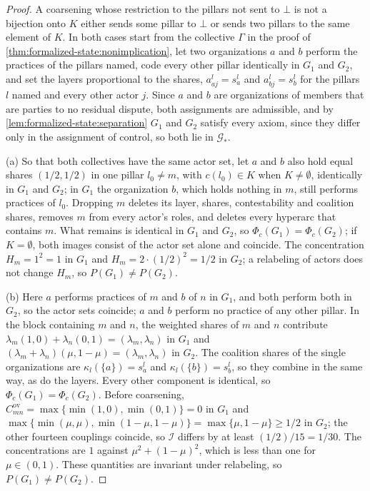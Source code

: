 \documentclass[11pt,letterpaper]{article}
\theoremstyle{definition}
\theoremstyle{remark}
\newcommand{\Integ}{\mathcal{I}}
\newcommand{\ov}{\mathrm{ov}}
\begin{document}
\begin{proof}
A coarsening whose restriction to the pillars not sent to $\bot$ is not a bijection onto $K$ either sends some pillar to $\bot$ or sends two pillars to the same element of $K$. In both cases start from the collective $\Gamma$ in the proof of \cref{thm:formalized-state:nonimplication}, let two organizations $a$ and $b$ perform the practices of the pillars named, code every other pillar identically in $G_1$ and $G_2$, and set the layers proportional to the shares, $a^{l}_{aj}=s^{l}_a$ and $a^{l}_{bj}=s^{l}_b$ for the pillars $l$ named and every other actor $j$. Since $a$ and $b$ are organizations of members that are parties to no residual dispute, both assignments are admissible, and by \cref{lem:formalized-state:separation} $G_1$ and $G_2$ satisfy every axiom, since they differ only in the assignment of control, so both lie in $\mathcal{G}_*$.

(a) So that both collectives have the same actor set, let $a$ and $b$ also hold equal shares $(1/2,1/2)$ in one pillar $l_0\neq m$, with $c(l_0)\in K$ when $K\neq\emptyset$, identically in $G_1$ and $G_2$; in $G_1$ the organization $b$, which holds nothing in $m$, still performs practices of $l_0$. Dropping $m$ deletes its layer, shares, contestability and coalition shares, removes $m$ from every actor's roles, and deletes every hyperarc that contains $m$. What remains is identical in $G_1$ and $G_2$, so $\Phi_c(G_1)=\Phi_c(G_2)$; if $K=\emptyset$, both images consist of the actor set alone and coincide. The concentration $H_m=1^2=1$ in $G_1$ and $H_m=2\cdot(1/2)^2=1/2$ in $G_2$; a relabeling of actors does not change $H_m$, so $P(G_1)\neq P(G_2)$.

(b) Here $a$ performs practices of $m$ and $b$ of $n$ in $G_1$, and both perform both in $G_2$, so the actor sets coincide; $a$ and $b$ perform no practice of any other pillar. In the block containing $m$ and $n$, the weighted shares of $m$ and $n$ contribute $\lambda_m(1,0)+\lambda_n(0,1)=(\lambda_m,\lambda_n)$ in $G_1$ and $(\lambda_m+\lambda_n)(\mu,1-\mu)=(\lambda_m,\lambda_n)$ in $G_2$. The coalition shares of the single organizations are $\kappa_l(\{a\})=s^l_a$ and $\kappa_l(\{b\})=s^l_b$, so they combine in the same way, as do the layers. Every other component is identical, so $\Phi_c(G_1)=\Phi_c(G_2)$. Before coarsening, $C^{\ov}_{mn}=\max\{\min(1,0),\min(0,1)\}=0$ in $G_1$ and $\max\{\min(\mu,\mu),\min(1-\mu,1-\mu)\}=\max\{\mu,1-\mu\}\ge1/2$ in $G_2$; the other fourteen couplings coincide, so $\Integ$ differs by at least $(1/2)/15=1/30$. The concentrations are $1$ against $\mu^2+(1-\mu)^2$, which is less than one for $\mu\in(0,1)$. These quantities are invariant under relabeling, so $P(G_1)\neq P(G_2)$.
\end{proof}
\end{document}
